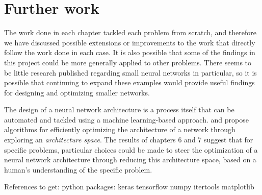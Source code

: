 \documentclass{somasmsc}
\begin{document}
\section{Further work}

The work done in each chapter tackled each problem from scratch, and therefore we have discussed possible extensions or improvements to the work that directly follow the work done in each case. It is also possible that some of the findings in this project could be more generally applied to other problems. There seems to be little research published regarding small neural networks in particular, so it is possible that continuing to expand these examples would provide useful findings for designing and optimizing smaller networks.

The design of a neural network architecture is a process itself that can be automated and tackled using a machine learning-based approach. \citet{luo2018neural} and \citet{pham2018efficient} propose algorithms for efficiently optimizing the architecture of a network through exploring an \textit{architecture space}. The results of chapters 6 and 7 suggest that for specific problems, particular choices could be made to steer the optimization of a neural network architecture through reducing this architecture space, based on a human's understanding of the specific problem.



\newpage
References to get:
python packages:
keras
tensorflow
numpy
itertools
matplotlib







\backmatter
\renewcommand{\bibname}{References}



\end{document}
